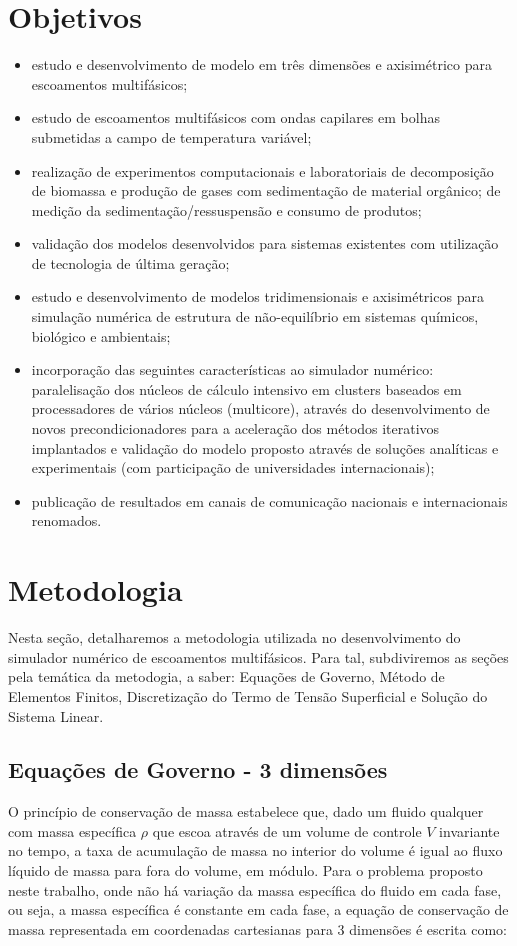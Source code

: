 \documentclass[a4paper,portuges,12pt]{article}
\begin{document}
\section{Objetivos}
\begin{itemize}
	\item estudo e desenvolvimento de modelo em três dimensões e axisimétrico
	      para escoamentos multifásicos;
	\item estudo de escoamentos multifásicos com ondas capilares em bolhas
	      submetidas a campo de temperatura variável;
	\item realização de experimentos computacionais e laboratoriais de
		  decomposição de biomassa e produção de gases com sedimentação
		  de material orgânico; de medição da sedimentação/ressuspensão
		  e consumo de produtos;
	\item validação dos modelos desenvolvidos para sistemas existentes com
	      utilização de tecnologia de última geração;
	\item estudo e desenvolvimento de modelos tridimensionais e axisimétricos
		  para simulação numérica de estrutura de não-equilíbrio em
		  sistemas químicos, biológico e ambientais;
	\item incorporação das seguintes características ao simulador numérico:
		  paralelisação dos núcleos de cálculo intensivo em clusters
		  baseados em processadores de vários núcleos (multicore),
		  através do desenvolvimento de novos precondicionadores para a
		  aceleração dos métodos iterativos implantados e validação do
		  modelo proposto através de soluções analíticas e experimentais
		  (com participação de universidades internacionais);
	\item publicação de resultados em canais de comunicação nacionais e
	      internacionais renomados.
\end{itemize}

\section{Metodologia}
Nesta seção, detalharemos a metodologia utilizada no desenvolvimento do
simulador numérico de escoamentos multifásicos. Para tal, subdiviremos
as seções pela temática da metodogia, a saber: Equações de Governo,
Método de Elementos Finitos, Discretização do Termo de Tensão
Superficial e Solução do Sistema Linear.

\subsection{Equações de Governo - 3 dimensões}
O princípio de conservação de massa estabelece que, dado um fluido
qualquer com massa específica $\rho$ que escoa através de um volume de
controle $V$ invariante no tempo, a taxa de acumulação de massa no
interior do volume é igual ao fluxo líquido de massa para fora do
volume, em módulo. Para o problema proposto neste trabalho, onde não há
variação da massa específica do fluido em cada fase, ou seja, a massa
específica é constante em cada fase, a equação de conservação de massa
representada em coordenadas cartesianas para 3 dimensões é escrita como:
\end{document}
